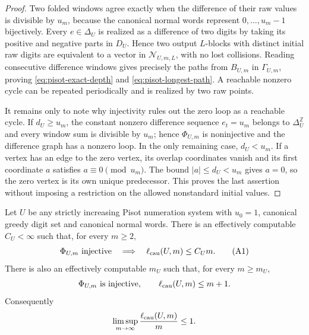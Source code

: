 \begin{proof}
Two folded windows agree exactly when the difference of their raw values is
divisible by $u_m$, because the canonical normal words represent
$0,\ldots,u_m-1$ bijectively.  Every $e\in\Delta_U$ is realized as a
difference of two digits by taking its positive and negative parts in
$D_U$.  Hence two output $L$-blocks with distinct initial raw digits are
equivalent to a vector in $\mathcal N_{U,m,L}$, with no lost collisions.
Reading consecutive difference windows gives precisely the paths from
$B_{U,m}$ in $\Gamma_{U,m}$, proving \eqref{eq:pisot-exact-depth} and
\eqref{eq:pisot-longest-path}.  A reachable nonzero cycle can be repeated
periodically and is realized by two raw points.

It remains only to note why injectivity rules out the zero loop as a
reachable cycle.  If $d_U\ge u_m$, the constant nonzero difference sequence
$e_t=u_m$ belongs to $\Delta_U^{\mathbb Z}$ and every window sum is divisible
by $u_m$; hence $\Phi_{U,m}$ is noninjective and the difference graph has a
nonzero loop.  In the only remaining case, $d_U<u_m$.  If a vertex has an
edge to the zero vertex, its overlap coordinates vanish and its first
coordinate $a$ satisfies $a\equiv0\pmod {u_m}$.  The bound
$|a|\le d_U<u_m$ gives $a=0$, so the zero vertex is its own unique
predecessor.  This proves the last assertion without imposing a restriction
on the allowed nonstandard initial values.
\end{proof}

\begin{corollary}
\label{cor:pisot-linear-causal-depth}
Let $U$ be any strictly increasing Pisot numeration system with $u_0=1$,
canonical greedy digit set and canonical normal words.  There is an
effectively computable $C_U<\infty$ such that, for every $m\ge2$,
\begin{equation*}
\Phi_{U,m}\text{ injective}
\quad\Longrightarrow\quad
\ell_{\rm cau}(U,m)\le C_Um.
\tag{A1}\label{eq:pisot-linear-A1}
\end{equation*}
There is also an effectively computable $m_U$ such that, for every
$m\ge m_U$,
\begin{equation}
\Phi_{U,m}\text{ is injective},\qquad
\ell_{\rm cau}(U,m)\le m+1.
\label{eq:pisot-eventual-injectivity}
\end{equation}
Consequently
\begin{equation}
\limsup_{m\to\infty}\frac{\ell_{\rm cau}(U,m)}m\le1.
\label{eq:pisot-universal-asymptotic-slope}
\end{equation}
\end{corollary}

